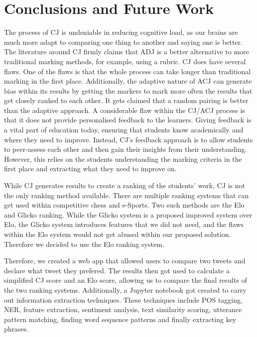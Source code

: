 \chapter{Conclusions and Future Work}
\label{chap:conclusion}


The process of CJ is undeniable in reducing cognitive load, as our brains are much more adapt to comparing one thing to another and saying one is better. The literature around CJ firmly claims that ADJ is a better alternative to more traditional marking methods, for example, using a rubric. CJ does have several flaws. One of the flaws is that the whole process can take longer than traditional marking in the first place. Additionally, the adaptive nature of ACJ can generate bias within its results by getting the markers to mark more often the results that get closely ranked to each other. It gets claimed that a random pairing is better than the adaptive approach. A considerable flaw within the CJ/ACJ process is that it does not provide personalised feedback to the learners. Giving feedback is a vital part of education today, ensuring that students know academically and where they need to improve. Instead, CJ's feedback approach is to allow students to peer-assess each other and then gain their insights from their understanding. However, this relies on the students understanding the marking criteria in the first place and extracting what they need to improve on.

While CJ generates results to create a ranking of the students' work, CJ is not the only ranking method available. There are multiple ranking systems that can get used within competitive chess and e-Sports. Two such methods are the Elo and Glicko ranking. While the Glicko system is a proposed improved system over Elo, the Glicko system introduces features that we did not need, and the flaws within the Elo system would not get abused within our proposed solution. Therefore we decided to use the Elo ranking system.

Therefore, we created a web app that allowed users to compare two tweets and declare what tweet they prefered. The results then got used to calculate a simplified CJ score and an Elo score, allowing us to compare the final results of the two ranking systems. Additionally, a Jupyter notebook got created to carry out information extraction techniques. These techniques include POS tagging, NER, feature extraction, sentiment analysis, text similarity scoring, utterance pattern matching, finding word sequence patterns and finally extracting key phrases.

